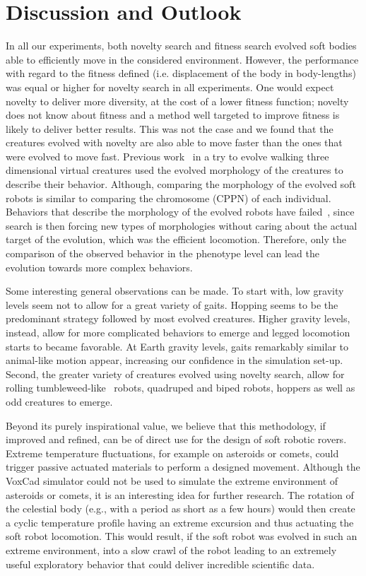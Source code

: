 \documentclass{sig-alternate}
\begin{document}
\section{Discussion and Outlook}
In all our experiments, both novelty search and fitness search evolved soft bodies able to efficiently move in the considered environment. However, the performance with regard to the fitness defined (i.e. displacement of the body in body-lengths) was equal or higher for novelty search in all experiments. One would expect novelty to deliver more diversity, at the cost of a lower fitness function; novelty does not know about fitness and a method well targeted to improve fitness is likely to deliver better results. This was not the case and we found that the creatures evolved with novelty are also able to move faster than the ones that were evolved to move fast. Previous work~\cite{lehman2011evolving} in a try to evolve walking three dimensional virtual creatures used the evolved morphology of the creatures to describe their behavior. Although, comparing the morphology of the evolved soft robots is similar to comparing the chromosome (CPPN) of each individual. Behaviors that describe the morphology of the evolved robots have failed~\cite{lehman2011evolving}, since search is then forcing new types of morphologies without caring about the actual target of the evolution, which was the efficient locomotion. Therefore, only the comparison of the observed behavior in the phenotype level can lead the evolution towards more complex behaviors. 

Some interesting general observations can be made. To start with, low gravity levels seem not to allow for a great variety of gaits. Hopping seems to be the predominant strategy followed by most evolved creatures. Higher gravity levels, instead, allow for more complicated behaviors to emerge and legged locomotion starts to became favorable. At Earth gravity levels, gaits remarkably similar to animal-like motion appear, increasing our confidence in the simulation set-up. Second, the greater variety of creatures evolved using novelty search, allow for rolling tumbleweed-like~\cite{antol2003low} robots, quadruped and biped robots, hoppers as well as odd creatures to emerge. 

Beyond its purely inspirational value, we believe that this methodology, if improved and refined, can be of direct use for the design of soft robotic rovers. Extreme temperature fluctuations, for example on asteroids or comets, could trigger passive actuated materials to perform a designed movement. Although the VoxCad simulator could not be used to simulate the extreme environment of asteroids or comets, it is an interesting idea for further research. The rotation of the celestial body (e.g., with a period as short as a few hours) would then create a cyclic temperature profile having an extreme excursion and thus actuating the soft robot locomotion. This would result, if the soft robot was evolved in such an extreme environment, into a slow crawl of the robot leading to an extremely useful exploratory behavior that could deliver incredible scientific data. %
\newpage
\end{document}
